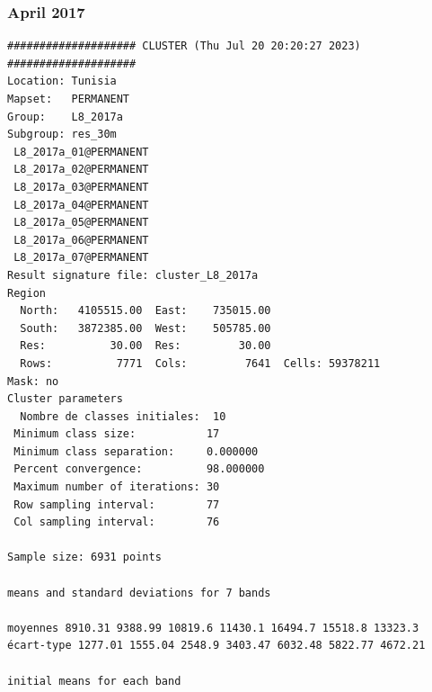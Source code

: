 \documentclass[land,article,submit,pdftex,moreauthors]{Definitions/mdpi}
\begin{document}
\subsubsection[\appendixname~\thesubsubsection]{April 2017}
\begin{scriptsize}
\begin{verbatim}
#################### CLUSTER (Thu Jul 20 20:20:27 2023) ####################
Location: Tunisia
Mapset:   PERMANENT
Group:    L8_2017a
Subgroup: res_30m
 L8_2017a_01@PERMANENT
 L8_2017a_02@PERMANENT
 L8_2017a_03@PERMANENT
 L8_2017a_04@PERMANENT
 L8_2017a_05@PERMANENT
 L8_2017a_06@PERMANENT
 L8_2017a_07@PERMANENT
Result signature file: cluster_L8_2017a
Region
  North:   4105515.00  East:    735015.00
  South:   3872385.00  West:    505785.00
  Res:          30.00  Res:         30.00
  Rows:          7771  Cols:         7641  Cells: 59378211
Mask: no
Cluster parameters
  Nombre de classes initiales: 	10
 Minimum class size:           17
 Minimum class separation:     0.000000
 Percent convergence:          98.000000
 Maximum number of iterations: 30
 Row sampling interval:        77
 Col sampling interval:        76

Sample size: 6931 points

means and standard deviations for 7 bands

moyennes 8910.31 9388.99 10819.6 11430.1 16494.7 15518.8 13323.3
écart-type 1277.01 1555.04 2548.9 3403.47 6032.48 5822.77 4672.21

initial means for each band


\end{verbatim}
\end{scriptsize}
\end{document}
